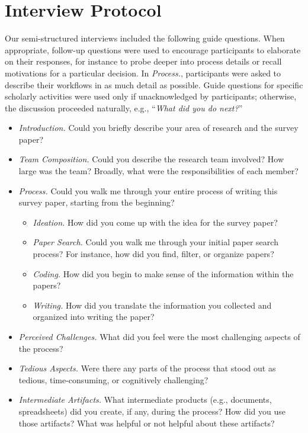 \section{Interview Protocol} \label{sec:interview_protocol}
Our semi-structured interviews included the following guide questions. When appropriate, follow-up questions were used to encourage participants to elaborate on their responses, for instance to probe deeper into process details or recall motivations for a particular decision. In \textit{Process.}, participants were asked to describe their workflows in as much detail as possible. Guide questions for specific scholarly activities were used only if unacknowledged by participants; otherwise, the discussion proceeded naturally, e.g., ``\textit{What did you do next?}''

\begin{itemize}
    \item \textit{Introduction.} Could you briefly describe your area of research and the survey paper?
    \item \textit{Team Composition.} Could you describe the research team involved? How large was the team? Broadly, what were the responsibilities of each member?
    \item \textit{Process.} Could you walk me through your entire process of writing this survey paper, starting from the beginning?
    \begin{itemize}
        \item \textit{Ideation.} How did you come up with the idea for the survey paper?
        \item \textit{Paper Search.} Could you walk me through your initial paper search process? For instance, how did you find, filter, or organize papers?
        \item \textit{Coding.} How did you begin to make sense of the information within the papers?
        \item \textit{Writing.} How did you translate the information you collected and organized into writing the paper? 
    \end{itemize}
    \item \textit{Perceived Challenges.} What did you feel were the most challenging aspects of the process?
    \item \textit{Tedious Aspects.} Were there any parts of the process that stood out as tedious, time-consuming, or cognitively challenging?
    \item \textit{Intermediate Artifacts.} What intermediate products (e.g., documents, spreadsheets) did you create, if any, during the process? How did you use those artifacts? What was helpful or not helpful about these artifacts?

\end{itemize}
